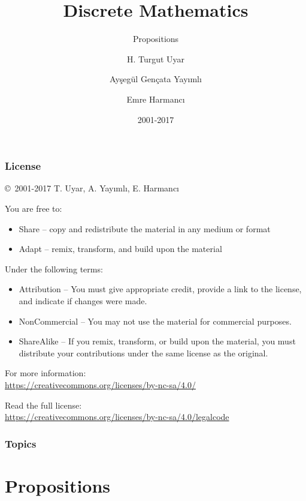 \documentclass[dvipsnames]{beamer}
\title{Discrete Mathematics}
\subtitle{Propositions}
\author{H. Turgut Uyar \and Ayşegül Gençata Yayımlı \and Emre Harmancı}
\date{2001-2017}
\begin{document}
\begin{frame}
  \titlepage
\end{frame}

\begin{frame}
  \frametitle{License}

  \hfill
  \copyright~2001-2017 T. Uyar, A. Yayımlı, E. Harmancı

  \vfill
  \begin{footnotesize}
    You are free to:
    \begin{itemize}
      \itemsep0em
      \item Share -- copy and redistribute the material in any medium or format
      \item Adapt -- remix, transform, and build upon the material
    \end{itemize}

    Under the following terms:
    \begin{itemize}
      \itemsep0em
      \item Attribution -- You must give appropriate credit, provide a link to
        the license, and indicate if changes were made.

      \item NonCommercial -- You may not use the material for commercial
        purposes.

      \item ShareAlike -- If you remix, transform, or build upon the material,
        you must distribute your contributions under the same license as the
        original.
    \end{itemize}
  \end{footnotesize}

  \begin{small}
    For more information:\\
    \url{https://creativecommons.org/licenses/by-nc-sa/4.0/}

    \smallskip
    Read the full license:\\
    \url{https://creativecommons.org/licenses/by-nc-sa/4.0/legalcode}
  \end{small}
\end{frame}

\begin{frame}
  \frametitle{Topics}
  \tableofcontents
\end{frame}

\section{Propositions}
\end{document}

